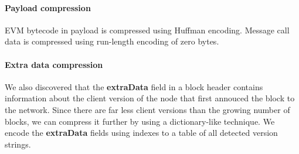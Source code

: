 \paragraph{Payload compression} EVM bytecode in payload is compressed using Huffman encoding. Message call data is compressed
using run-length encoding of zero bytes.

\paragraph{Extra data compression} We also discovered that the \textbf{extraData} field in a block header contains information
about the client version of the node that first annouced the block to the network. Since there are far less client versions
than the growing number of blocks, we can compress it further by using a dictionary-like technique. We encode the
\textbf{extraData} fields using indexes to a table of all detected version strings.

